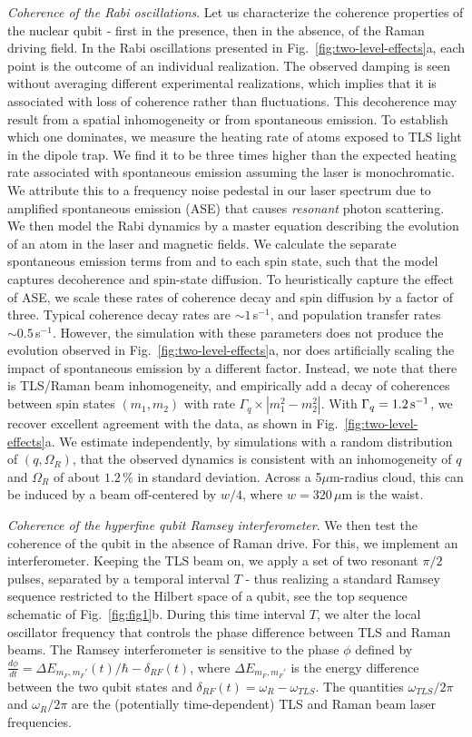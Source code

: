 \textit{Coherence of the Rabi oscillations}. Let us characterize the coherence properties of the nuclear qubit - first in the presence, then in the absence, of the Raman driving field. In the Rabi oscillations presented in Fig.~\ref{fig:two-level-effects}a, each point is the outcome of an individual realization. The observed damping is seen without averaging different experimental realizations, which implies that it is associated with loss of coherence rather than fluctuations. This decoherence may result from a spatial inhomogeneity or from spontaneous emission. To establish which one dominates, we measure the heating rate of atoms exposed to TLS light in the dipole trap. We find it to be three times higher than the expected heating rate associated with spontaneous emission assuming the laser is monochromatic. We attribute this to a frequency noise pedestal in our laser spectrum due to amplified spontaneous emission (ASE) that causes \textit{resonant} photon scattering. We then model the Rabi dynamics by a master equation describing the evolution of an atom in the laser and magnetic fields. We calculate the separate spontaneous emission terms from and to each spin state, such that the model captures decoherence and spin-state diffusion. To heuristically capture the effect of ASE, we scale these rates of coherence decay and spin diffusion by a factor of three. Typical coherence decay rates are $\sim 1\,$s$^{-1}$, and population transfer rates $\sim 0.5\,$s$^{-1}$. However, the simulation with these parameters does not produce the evolution observed in Fig.~\ref{fig:two-level-effects}a, nor does artificially scaling the impact of spontaneous emission by a different factor. Instead, we note that there is TLS/Raman beam inhomogeneity, and empirically add a decay of coherences between spin states $(m_1, m_2)$ with rate $\Gamma_q \times |m_1^2-m_2^2|$. With $\Gamma_q = 1.2\,\rm{s}^{-1}$, we recover excellent agreement with the data, as shown in Fig.~\ref{fig:two-level-effects}a. We estimate independently, by simulations with a random distribution of $(q,\Omega_R)$, that the observed dynamics is consistent with an inhomogeneity of $q$ and $\Omega_R$ of about $1.2\,\%$ in standard deviation. Across a 5$\mu$m-radius cloud, this can be induced by a beam off-centered by $w/4$, where $w=320\,\mu$m is the waist.

\textit{Coherence of the hyperfine qubit Ramsey interferometer}. We then test the coherence of the qubit in the absence of Raman drive. For this, we implement an interferometer. Keeping the TLS beam on, we apply a set of two resonant $\pi/2$ pulses, separated by a temporal interval $T$ - thus realizing a standard Ramsey sequence restricted to the Hilbert space of a qubit, see the top sequence schematic of Fig.~\ref{fig:fig1}b. During this time interval $T$, we alter the local oscillator frequency that controls the phase difference between TLS and Raman beams. The Ramsey interferometer is sensitive to the phase $\phi$ defined by $\frac{d \phi}{dt} = \Delta E_{m_F,m_F'} (t)/\hbar - \delta_{RF} (t) $, where $\Delta E_{m_F,m_F'}$ is the energy difference between the two qubit states and $\delta_{RF} (t) = \omega_R-\omega_{TLS}$. The quantities $\omega_{TLS} / 2 \pi$ and $\omega_R / 2 \pi$ are the (potentially time-dependent) TLS and Raman beam laser frequencies.

